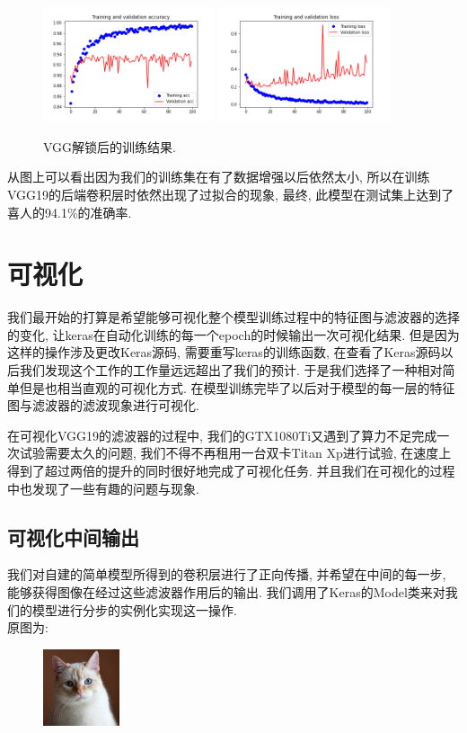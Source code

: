 \documentclass[lang=cn,11pt]{elegantpaper}
\begin{document}
\begin{figure}[hbt]
\centering
 \includegraphics[width=0.45\textwidth]{VGG_19_unlocked_1}
  \includegraphics[width=0.45\textwidth]{VGG_19_unlocked_2}
 \caption{VGG解锁后的训练结果.\label{fig:vggunlock}}
\end{figure}

从图上可以看出因为我们的训练集在有了数据增强以后依然太小, 所以在训练VGG19的后端卷积层时依然出现了过拟合的现象, 最终, 此模型在测试集上达到了喜人的94.1\%的准确率.

\section{可视化}

我们最开始的打算是希望能够可视化整个模型训练过程中的特征图与滤波器的选择的变化, 让keras在自动化训练的每一个epoch的时候输出一次可视化结果. 但是因为这样的操作涉及更改Keras源码, 需要重写keras的训练函数, 在查看了Keras源码以后我们发现这个工作的工作量远远超出了我们的预计. 于是我们选择了一种相对简单但是也相当直观的可视化方式. 在模型训练完毕了以后对于模型的每一层的特征图与滤波器的滤波现象进行可视化.

在可视化VGG19的滤波器的过程中, 我们的GTX1080Ti又遇到了算力不足完成一次试验需要太久的问题, 我们不得不再租用一台双卡Titan Xp进行试验, 在速度上得到了超过两倍的提升的同时很好地完成了可视化任务. 并且我们在可视化的过程中也发现了一些有趣的问题与现象.

\subsection{可视化中间输出}

我们对自建的简单模型所得到的卷积层进行了正向传播, 并希望在中间的每一步, 能够获得图像在经过这些滤波器作用后的输出. 我们调用了Keras的Model类来对我们的模型进行分步的实例化实现这一操作.\\
原图为: 
\begin{figure}[htbp]
	\centering
	  \includegraphics[width=0.2\textwidth]{a.jpg}
\end{figure}
\end{document}
